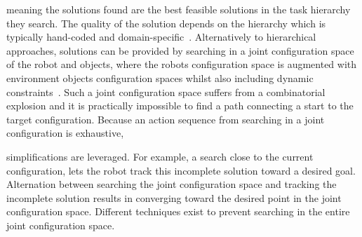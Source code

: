 meaning the solutions found are the best feasible solutions in the task hierarchy they search. The quality of the solution depends on the hierarchy which is typically hand-coded and domain-specific~\cite {vega-brown_asymptotically_2020}. Alternatively to hierarchical approaches, solutions can be provided by searching in a joint configuration space of the robot and objects, where the robots configuration space is augmented with environment objects configuration spaces whilst also including dynamic constraints~\cite{hauser_multimodal_2010,berenson_manipulation_2009,jaillet_path_2013}. Such a joint configuration space suffers from a combinatorial explosion and it is practically 
impossible to find a path connecting a start to the target configuration. Because an action sequence from searching in a joint configuration is exhaustive,


simplifications are leveraged. For example, a search close to the current configuration, lets the robot track this incomplete solution toward a desired goal. Alternation between searching the joint configuration space and tracking the incomplete solution results in converging toward the desired point in the joint configuration space. 
Different techniques exist to prevent searching in the entire joint configuration space.\bs

